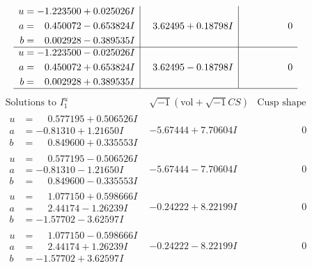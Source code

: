 \documentclass[1p]{elsarticle_modified}
\theoremstyle{definition}
\newcommand{\I}{\sqrt{-1}}
\begin{document}
$$\begin{array}{c|c|c}
\begin{aligned}
u &= -1.223500 + 0.025026 I \\
a &= \phantom{-}0.450072 - 0.653824 I \\
b &= \phantom{-}0.002928 - 0.389535 I\end{aligned}
 & \phantom{-}3.62495 + 0.18798 I & \phantom{-0.000000 } 0 \\ \hline\begin{aligned}
u &= -1.223500 - 0.025026 I \\
a &= \phantom{-}0.450072 + 0.653824 I \\
b &= \phantom{-}0.002928 + 0.389535 I\end{aligned}
 & \phantom{-}3.62495 - 0.18798 I & \phantom{-0.000000 } 0\\
 \hline 
 \end{array}$$\newpage$$\begin{array}{c|c|c}  
\text{Solutions to }I^u_{1}& \I (\text{vol} + \sqrt{-1}CS) & \text{Cusp shape}\\
 \hline 
\begin{aligned}
u &= \phantom{-}0.577195 + 0.506526 I \\
a &= -0.81310 + 1.21650 I \\
b &= \phantom{-}0.849600 + 0.335553 I\end{aligned}
 & -5.67444 + 7.70604 I & \phantom{-0.000000 } 0 \\ \hline\begin{aligned}
u &= \phantom{-}0.577195 - 0.506526 I \\
a &= -0.81310 - 1.21650 I \\
b &= \phantom{-}0.849600 - 0.335553 I\end{aligned}
 & -5.67444 - 7.70604 I & \phantom{-0.000000 } 0 \\ \hline\begin{aligned}
u &= \phantom{-}1.077150 + 0.598666 I \\
a &= \phantom{-}2.44174 - 1.26239 I \\
b &= -1.57702 - 3.62597 I\end{aligned}
 & -0.24222 + 8.22199 I & \phantom{-0.000000 } 0 \\ \hline\begin{aligned}
u &= \phantom{-}1.077150 - 0.598666 I \\
a &= \phantom{-}2.44174 + 1.26239 I \\
b &= -1.57702 + 3.62597 I\end{aligned}
 & -0.24222 - 8.22199 I & \phantom{-0.000000 } 0 \\ \hline\begin{aligned}

\end{aligned}
\end{array}$$
\end{document}
